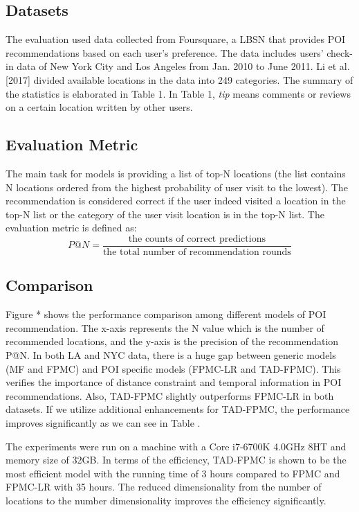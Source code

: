 \documentclass{sig-alternate}
\begin{document}
\subsection{Datasets}
\label{sec:datasets}
The evaluation used data collected from Foursquare, a LBSN that provides POI recommendations based on 
each user's preference. The data includes users' check-in data of New York City and Los Angeles from Jan. 
2010 to June 2011. Li et al. [2017] divided available locations in the data into 249 categories. 
The summary of the statistics is elaborated in Table 1. In Table 1, \emph{tip} means comments or reviews on a 
certain location written by other users.

\subsection{Evaluation Metric}
\label{metic}
The main task for models is providing a list of top-N locations (the list contains N locations 
ordered from the highest probability of user visit to the lowest). The recommendation is considered 
correct if the user indeed visited a location in the top-N list or the category of the user visit location 
is in the top-N list. The evaluation metric is defined as:
\begin{equation}
	P@N = \frac{\textrm{the counts of correct predictions}} {\textrm{the total number of recommendation rounds}}
\label{eq:P@N}
\end{equation}


\subsection{Comparison}
\label{comparison}
Figure * shows the performance comparison among different models of POI recommendation. 
The x-axis represents the N value which is the number of recommended locations, and the y-axis 
is the precision of the recommendation P@N. In both LA and NYC data, there is a huge gap 
between generic models (MF and FPMC) and POI specific models (FPMC-LR and TAD-FPMC). 
This verifies the importance of distance constraint and temporal information in POI recommendations. 
Also, TAD-FPMC slightly outperforms FPMC-LR in both datasets. If we utilize additional enhancements 
for TAD-FPMC, the performance improves significantly as we can see in Table .

The experiments were run on a machine with a Core i7-6700K 4.0GHz 8HT and memory size of 32GB. 
In terms of the efficiency, TAD-FPMC is shown to be the most efficient model with the running time of 
3 hours compared to FPMC and FPMC-LR with 35 hours. The reduced dimensionality from the number of 
locations to the number dimensionality improves the efficiency significantly.
\end{document}

